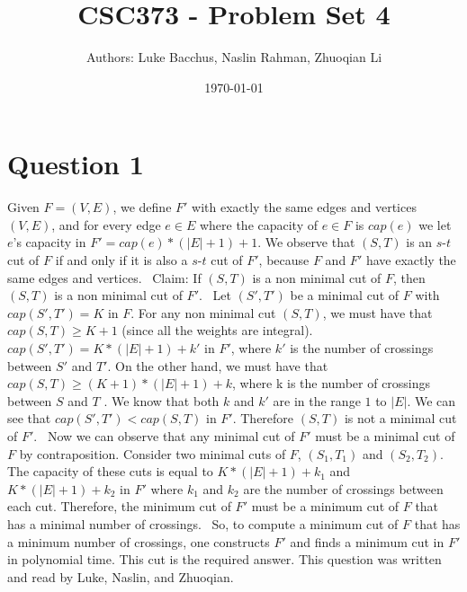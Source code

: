 \documentclass[12pt]{article}
\title{\textbf{CSC373 - Problem Set 4}}
\author{Authors: Luke Bacchus, Naslin Rahman, Zhuoqian Li}
\date{\today}
\begin{document}
\maketitle
\section*{Question 1}
Given $F = (V, E)$, we define $F'$ with exactly the same edges and vertices $(V, E)$, and for every edge $e \in E$ where the capacity of $e \in F$ is $cap(e)$ we let $e$'s capacity in $F' = cap(e) * (|E| + 1) + 1$.  We observe that $(S, T)$ is an $s$-$t$ cut of $F$ if and only if it is also a $s$-$t$ cut of $F'$, because $F$ and $F'$ have exactly the same edges and vertices. 
\newline \,
\newline Claim: If $(S, T)$ is a non minimal cut of $F$, then $(S, T)$ is a non minimal cut of $F'$. \newline \,
\newline Let $(S', T')$ be a minimal cut of $F$ with $cap(S', T') = K$ in $F$. For any non minimal cut $(S, T)$, we must have that $cap(S, T) \geq K + 1$ (since all the weights are integral). $cap(S', T') = K * (|E| + 1) + k'$ in $F'$, where $k'$ is the number of crossings between $S'$ and $T'$. On the other hand, we must have that $cap(S, T) \geq (K + 1) * (|E| + 1) + k$, where k is the number of crossings between $S$ and $T$ . We know that both $k$ and $k'$ are in the range $1$ to $|E|$. We can see that $cap(S', T') < cap(S, T)$ in $F'$. Therefore $(S, T)$ is not a minimal cut of $F'$.
\newline \, 
\newline
Now we can observe that any minimal cut of $F'$ must be a minimal cut of $F$ by contraposition. Consider two minimal cuts of $F$, $(S_1, T_1)$ and $(S_2, T_2)$. The capacity of these cuts is equal to $K * (|E| + 1) + k_1$ and $K * (|E| + 1) + k_2$ in $F'$ where $k_1$ and $k_2$ are the number of crossings between each cut. Therefore, the minimum cut of $F'$ must be a minimum cut of $F$ that has a minimal number of crossings.
\newline \, \newline
So, to compute a minimum cut of $F$ that has a minimum number of crossings, one constructs $F'$ and finds a minimum cut in $F'$ in polynomial time. This cut is the required answer.
\newline This question was written and read by  Luke, Naslin, and Zhuoqian.

\newpage
\end{document}
